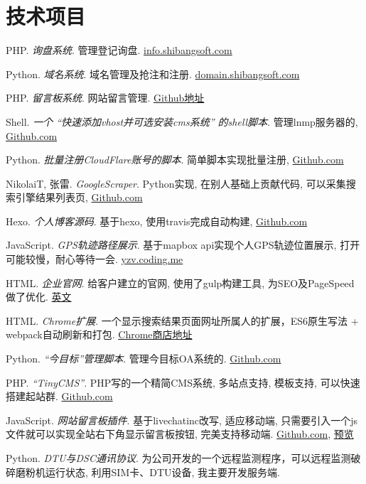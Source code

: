 \section{\textbf{技术项目}}
 \resumeSubHeadingListStart
   \item{
       PHP.
       \emph{询盘系统}.
       管理登记询盘. \href{http://info.shibangsoft.com}{info.shibangsoft.com}
   }
   \item{
       Python.
       \emph{域名系统}.
       域名管理及抢注和注册. \href{http://domain.shibangsoft.com}{domain.shibangsoft.com}
   }
   \item{
       PHP.
       \emph{留言板系统}.
       网站留言管理.  \href{https://github.com/sbmzhcn/inquiry}{Github地址}
   }
   \item{
       Shell.
       \emph{一个 ``快速添加vhost并可选安装cms系统'' 的shell脚本}.
       管理lnmp服务器的, \href{https://github.com/sbmzhcn/Tools}{Github.com}
   }
   \item{
       Python.
       \emph{批量注册CloudFlare账号的脚本}.
       简单脚本实现批量注册, \href{https://github.com/sbmzhcn/cloudflare}{Github.com}
   }
   \item{
       NikolaiT, 张雷.
       \emph{GoogleScraper}.
       Python实现, 在别人基础上贡献代码, 可以采集搜索引擎结果列表页, \href{https://github.com/NikolaiT/GoogleScraper/blob/master/AUTHORS}{Github.com}
   }
   \item{
       Hexo.
       \emph{个人博客源码}.
       基于hexo, 使用travis完成自动构建, \href{https://github.com/sbmzhcn/sbmzhcn.github.io/tree/source}{Github.com}
   }
   \item{
       JavaScript.
       \emph{GPS轨迹路径展示}.
       基于mapbox api实现个人GPS轨迹位置展示, 打开可能较慢，耐心等待一会. \href{http://yzv.coding.me/#portfolio/portfolio-4}{yzv.coding.me}
   }
   \item{
       HTML.
       \emph{企业官网}.
       给客户建立的官网, 使用了gulp构建工具, 为SEO及PageSpeed做了优化. \href{https://www.kamychina.com/}{英文}
   }
   \item{
       HTML.
       \emph{Chrome扩展}.
       一个显示搜索结果页面网址所属人的扩展，ES6原生写法 + webpack自动刷新和打包. \href{https://chrome.google.com/webstore/detail/ifbiiojnbgljbjffmacihhdkeomdkifc}{Chrome商店地址}
   }
   \item{
       Python.
       \emph{``今目标''管理脚本}.
       管理今目标OA系统的. \href{https://github.com/sbmzhcn/Jingoal}{Github.com}
   }
   \item{
       PHP.
       \emph{``TinyCMS''}.
       PHP写的一个精简CMS系统, 多站点支持, 模板支持, 可以快速搭建起站群. \href{https://github.com/sbmzhcn/Jingoal}{Github.com}
   }
   \item{
       JavaScript.
       \emph{网站留言板插件}.
       基于livechatinc改写, 适应移动端, 只需要引入一个js文件就可以实现全站右下角显示留言板按钮, 完美支持移动端. \href{https://github.com/sbmzhcn/sbmzhcn.github.io/tree/master/livechat}{Github.com},
       \href{http://www.barrettbatemanfoundation.org/}{预览}
   }
   \item{
       Python.
       \emph{DTU与DSC通讯协议}.
       为公司开发的一个远程监测程序，可以远程监测破碎磨粉机运行状态, 利用SIM卡、DTU设备, 我主要开发服务端.
   }

 \resumeSubHeadingListEnd

